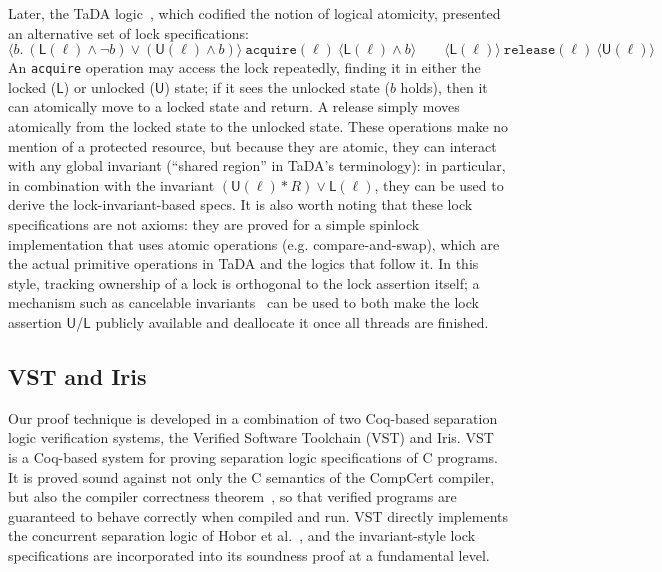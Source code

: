\documentclass[runningheads]{llncs}
\begin{document}
Later, the TaDA logic~\cite{tada}, which codified the notion of logical atomicity, presented an alternative set of lock specifications:
$$\langle b.\ (\mathsf{L}(\ell) \land \neg b) \vee (\mathsf{U}(\ell) \land b) \rangle\ \texttt{acquire}(\ell)\ \langle \mathsf{L}(\ell) \land b \rangle \qquad \langle \mathsf{L}(\ell) \rangle\ \texttt{release}(\ell)\ \langle \mathsf{U}(\ell) \rangle$$
An \texttt{acquire} operation may access the lock repeatedly, finding it in either the locked ($\mathsf{L}$) or unlocked ($\mathsf{U}$) state; if it sees the unlocked state ($b$ holds), then it can atomically move to a locked state and return. A release simply moves atomically from the locked state to the unlocked state. These operations make no mention of a protected resource, but because they are atomic, they can interact with any global invariant (``shared region'' in TaDA's terminology): in particular, in combination with the invariant $(\mathsf{U}(\ell) * R) \vee \mathsf{L}(\ell)$, they can be used to derive the lock-invariant-based specs. It is also worth noting that these lock specifications are not axioms: they are proved for a simple spinlock implementation that uses atomic operations (e.g. compare-and-swap), which are the actual primitive operations in TaDA and the logics that follow it. In this style, tracking ownership of a lock is orthogonal to the lock assertion itself; a mechanism such as cancelable invariants~\cite{rustbelt-relaxed} can be used to both make the lock assertion $\mathsf{U}$/$\mathsf{L}$ publicly available and deallocate it once all threads are finished.

\subsection{VST and Iris}

Our proof technique is developed in a combination of two Coq-based separation logic verification systems, the Verified Software Toolchain (VST) and Iris. VST~\cite{plfcc} is a Coq-based system for proving separation logic specifications of C programs. It is proved sound against not only the C semantics of the CompCert compiler, but also the compiler correctness theorem~\cite{cpm}, so that verified programs are guaranteed to behave correctly when compiled and run. VST directly implements the concurrent separation logic of Hobor et al.~\cite{oraclesematic}, and the invariant-style lock specifications are incorporated into its soundness proof at a fundamental level.
\end{document}
